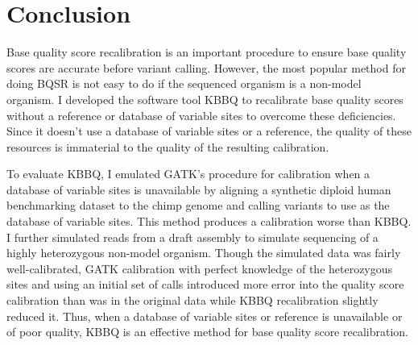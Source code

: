 

\section{Conclusion}

Base quality score recalibration is an important procedure to ensure base quality scores are accurate before variant calling. However, the most popular method for doing BQSR is not easy to do if the sequenced organism is a non-model organism. I developed the software tool KBBQ to recalibrate base quality scores without a reference or database of variable sites to overcome these deficiencies. Since it doesn't use a database of variable sites or a reference, the quality of these resources is immaterial to the quality of the resulting calibration.

To evaluate KBBQ, I emulated GATK's procedure for calibration when a database of variable sites is unavailable by aligning a synthetic diploid human benchmarking dataset to the chimp genome and calling variants to use as the database of variable sites. This method produces a calibration worse than KBBQ. I further simulated reads from a draft assembly to simulate sequencing of a highly heterozygous non-model organism. Though the simulated data was fairly well-calibrated, GATK calibration with perfect knowledge of the heterozygous sites and using an initial set of calls introduced more error into the quality score calibration than was in the original data while KBBQ recalibration slightly reduced it. Thus, when a database of variable sites or reference is unavailable or of poor quality, KBBQ is an effective method for base quality score recalibration.

\printbibliography[segment=\therefsegment]{}


